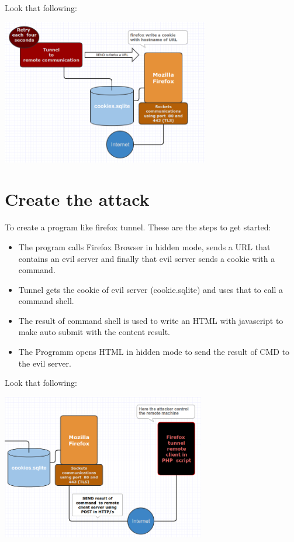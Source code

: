 \documentclass[tog]{acmsiggraph}
\begin{document}
Look that following:

\includegraphics[height=2.5in]{images/tunnel4.png}



\section{Create the attack}

To create a program like firefox tunnel. These are the steps to get started:
\begin{itemize}
\item The program calls Firefox Browser in hidden mode, sends a URL that contains an evil server and finally that evil server sends a cookie with a command.
\item Tunnel gets the cookie of evil server (cookie.sqlite) and uses that to call a command shell.
\item The result of command shell is used to write an HTML with javascript to make auto submit with the content result.
\item The Programm opens HTML in hidden mode to send the result of CMD to the evil server.
\end{itemize}

Look that following:

\includegraphics[height=2.5in]{images/tunnel8.png}
\end{document}
